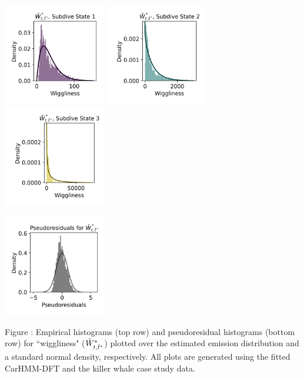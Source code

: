 \documentclass{article}
\begin{document}
        \begin{center}
        \includegraphics[width=1.75in]{../Plots/2019/20190902-182840-CATs_OB_1_0_267_CarHMM_empirical_hist_ahat_0.png}
        \includegraphics[width=1.75in]{../Plots/2019/20190902-182840-CATs_OB_1_0_267_CarHMM_empirical_hist_ahat_1.png}
        \includegraphics[width=1.75in]{../Plots/2019/20190902-182840-CATs_OB_1_0_267_CarHMM_empirical_hist_ahat_2.png}
        
        \includegraphics[width=1.75in]{../Plots/2019/20190902-182840-CATs_OB_1_0_267_CarHMM_pseudresids_ahat.png}
        \end{center}
        
        \noindent Figure : Empirical histograms (top row) and pseudoresidual histograms (bottom row) for ``wiggliness" ($\tilde{W}^*_{t,\tilde t^*}$) plotted over the estimated emission distribution and a standard normal density, respectively. All plots are generated using the fitted CarHMM-DFT and the killer whale case study data.
        \addtocounter{fignum}{1}
        
\end{document}
